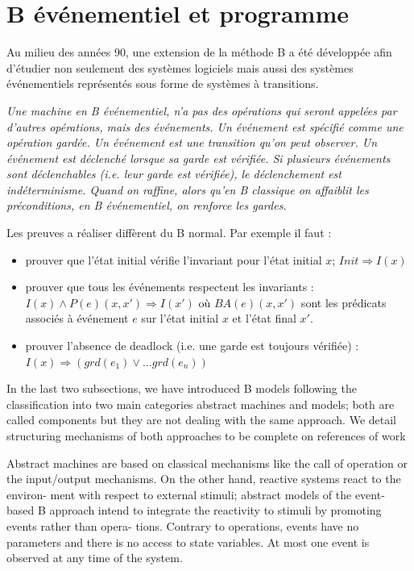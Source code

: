 \documentclass[10pt,a4paper]{article}
\begin{document}
\section{B événementiel et programme}

Au milieu des années 90, une extension de la méthode B a été développée afin d'étudier non seulement des systèmes logiciels mais aussi des systèmes événementiels représentés sous forme de systèmes à transitions.

\emph{Une machine en B  événementiel, n'a pas des opérations qui seront appelées par d'autres opérations, mais des  événements. Un  événement est spécifié comme une opération gardée. Un événement  est une transition qu'on peut observer.\newline
\indent Un  événement est déclenché lorsque sa garde est vérifiée. Si plusieurs événements sont déclenchables (i.e. leur garde est vérifiée), le déclenchement est indéterminisme. \newline
\indent Quand on raffine, alors qu'en B classique on affaiblit les préconditions, en B événementiel, on renforce les gardes.}\cite{habrias2006specifications}

Les preuves a réaliser diffèrent du B \og normal\fg. Par exemple il faut :
\begin{itemize}
\item prouver que l'état initial vérifie l'invariant pour l'état initial $x$; $ Init \Rightarrow I(x)$
\item prouver que tous les événements respectent les invariants : $ I(x) \wedge P(e)(x, x') \Rightarrow I(x')$ où $BA(e)(x, x')$ sont les prédicats associés à événement $e$ sur l'état initial $x$ et l'état final $x'$.
\item prouver l'absence de deadlock (i.e. une garde est toujours vérifiée) : $ I(x) \Rightarrow \left( grd(e_1) \vee \ldots grd(e_n) \right)$
\end{itemize}

\iffalse
In the last two subsections, we have introduced B models following the classification
into two main categories abstract machines and models; both are called components
but they are not dealing with the same approach. We detail structuring mechanisms
of both approaches to be complete on references of work 

Abstract machines are based on classical mechanisms like the call of operation or the
input/output mechanisms. On the other hand, reactive systems react to the environ-
ment with respect to external stimuli; abstract models of the event-based B approach
intend to integrate the reactivity to stimuli by promoting events rather than opera-
tions.
Contrary to operations, events have no parameters and there is no access to
state variables. At most one event is observed at any time of the system.
\end{document}
